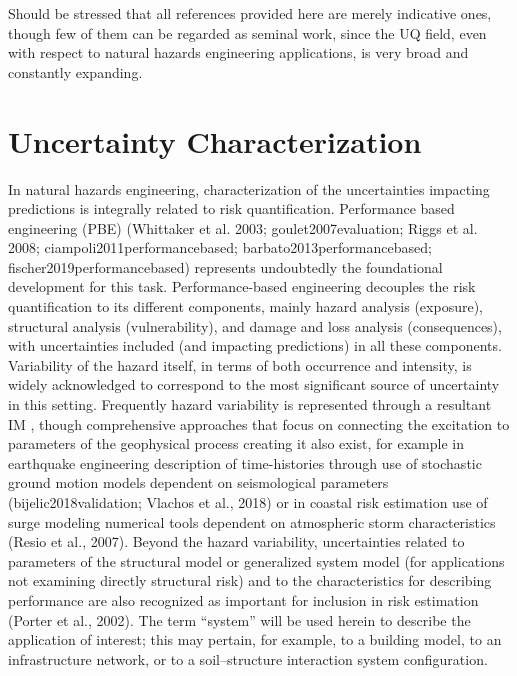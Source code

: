 Should be stressed that all references provided here are merely indicative ones, though few of them can be regarded as seminal work, since the UQ field, even with respect to natural hazards engineering applications, is very broad and constantly expanding.    

\section{Uncertainty Characterization}
\label{sec:uq_characterization}

In natural hazards engineering, characterization of the uncertainties impacting predictions is integrally related to risk quantification. Performance based engineering (PBE) (Whittaker et al. 2003; goulet2007evaluation; Riggs et al. 2008; ciampoli2011performancebased; barbato2013performancebased; fischer2019performancebased) represents undoubtedly the foundational development for this task. Performance-based engineering decouples the risk quantification to its different components, mainly hazard analysis (exposure), structural analysis (vulnerability), and damage and loss analysis (consequences), with uncertainties included (and impacting predictions) in all these components. Variability of the hazard itself, in terms of both occurrence and intensity, is widely acknowledged to correspond to the most significant source of uncertainty in this setting. Frequently hazard variability is represented through a resultant IM \citep{baker2005vectorvalued,kohrangi2016implications}, though comprehensive approaches that focus on connecting the excitation to parameters of the geophysical process creating it also exist, for example in earthquake engineering description of time-histories through use of stochastic ground motion models dependent on seismological parameters (bijelic2018validation; Vlachos et al., 2018) or in coastal risk estimation use of surge modeling numerical tools dependent on atmospheric storm characteristics (Resio et al., 2007). Beyond the hazard variability, uncertainties related to parameters of the structural model or generalized system model (for applications not examining directly structural risk) and to the characteristics for describing performance are also recognized as important for inclusion in risk estimation (Porter et al., 2002). The term “system” will be used herein to describe the application of interest; this may pertain, for example, to a building model, to an infrastructure network, or to a soil–structure interaction system configuration. 

